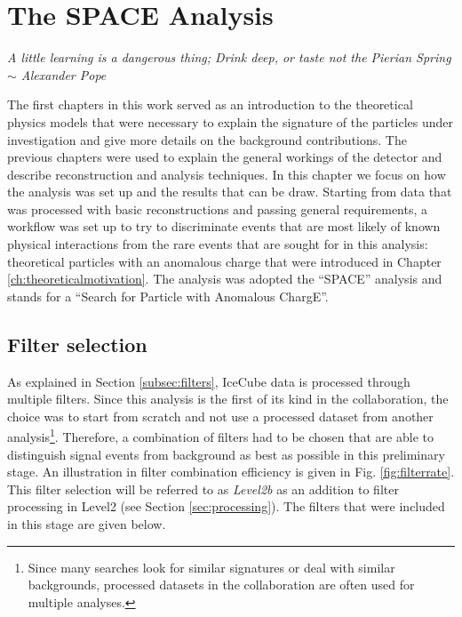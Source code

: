 \chapter{The SPACE Analysis}
\label{ch:space}
\begin{flushright}
\textit{A little learning is a dangerous thing; Drink deep, or taste not the Pierian Spring \\$\sim$ Alexander Pope}
\end{flushright}

\noindent The first chapters in this work served as an introduction to the theoretical physics models that were necessary to explain the signature of the particles under investigation and give more details on the background contributions. The previous chapters were used to explain the general workings of the detector and describe reconstruction and analysis techniques. In this chapter we focus on how the analysis was set up and the results that can be draw. Starting from data that was processed with basic reconstructions and passing general requirements, a workflow was set up to try to discriminate events that are most likely of known physical interactions from the rare events that are sought for in this analysis: theoretical particles with an anomalous charge that were introduced in Chapter \ref{ch:theoreticalmotivation}. The analysis was adopted the ``SPACE'' analysis and stands for a ``Search for Particle with Anomalous ChargE''.

\section{Filter selection}
\label{sec:filterselection}
As explained in Section \ref{subsec:filters}, IceCube data is processed through multiple filters. Since this analysis is the first of its kind in the collaboration, the choice was to start from scratch and not use a processed dataset from another analysis\footnote{Since many searches look for similar signatures or deal with similar backgrounds, processed datasets in the collaboration are often used for multiple analyses.}. Therefore, a combination of filters had to be chosen that are able to distinguish signal events from background as best as possible in this preliminary stage. An illustration in filter combination efficiency is given in Fig. \ref{fig:filterrate}. This filter selection will be referred to as \textit{Level2b} as an addition to filter processing in Level2 (see Section \ref{sec:processing}). The filters that were included in this stage are given below. 

